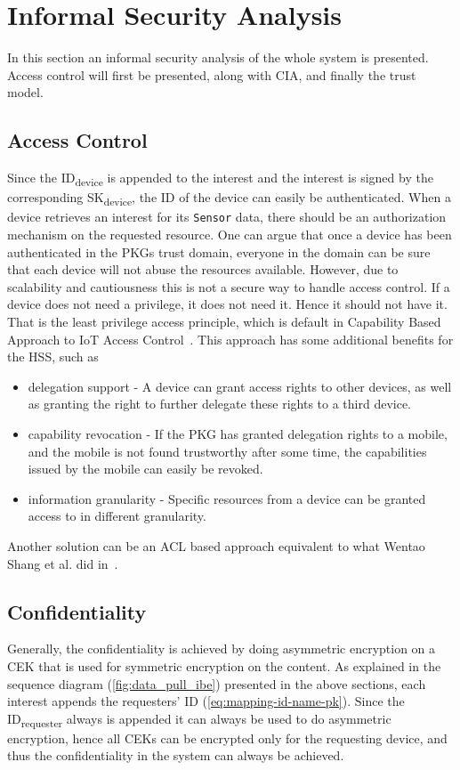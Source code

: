 \section{Informal Security Analysis}
In this section an informal security analysis of the whole system is presented.
Access control will first be presented, along with \gls{CIA}, and finally the trust model.

\subsection{Access Control}\label{access_control}
Since the ID\textsubscript{device} is appended to the \gls{interest} and the \gls{interest} is signed by the corresponding SK\textsubscript{device}, the \gls{ID} of the device can easily be authenticated. 
When a device retrieves an \gls{interest} for its \texttt{Sensor} \gls{data}, there should be an authorization mechanism on the requested resource. 
One can argue that once a device has been authenticated in the \gls{PKG}s trust domain, everyone in the domain can be sure that each device will not abuse the resources available. 
However, due to scalability and cautiousness this is not a secure way to handle access control. 
If a device does not need a privilege, it does not need it.
Hence it should not have it. 
That is the least privilege access principle, which is default in Capability Based Approach to \gls{IoT} Access Control~\cite{DBLP:conf/imis/GusmeroliPR12}.
This approach has some additional benefits for the \gls{HSS}, such as

\begin{itemize}
  \item delegation support - 
  A device can grant access rights to other devices, as well as granting the right to further delegate these rights to a third device.
  \item capability revocation - 
  If the \gls{PKG} has granted delegation rights to a mobile, and the mobile is not found trustworthy after some time, the capabilities issued by the mobile can easily be revoked.
  \item information granularity - 
  Specific resources from a device can be granted access to in different granularity.
\end{itemize}

Another solution can be an \gls{ACL} based approach equivalent to what Wentao Shang et al. did in~\cite{DBLP:journals/network/ShangDMBZ14}.

\subsection{Confidentiality}
Generally, the confidentiality is achieved by doing asymmetric encryption on a \gls{CEK} that is used for symmetric encryption on the content.
As explained in the sequence diagram (\autoref{fig:data_pull_ibe}) presented in the above sections, each \gls{interest} appends the requesters' ID (\autoref{eq:mapping-id-name-pk}).
Since the ID\textsubscript{requester} always is appended it can always be used to do asymmetric encryption, hence all \gls{CEK}s can be encrypted only for the requesting device, and thus the confidentiality in the system can always be achieved.

